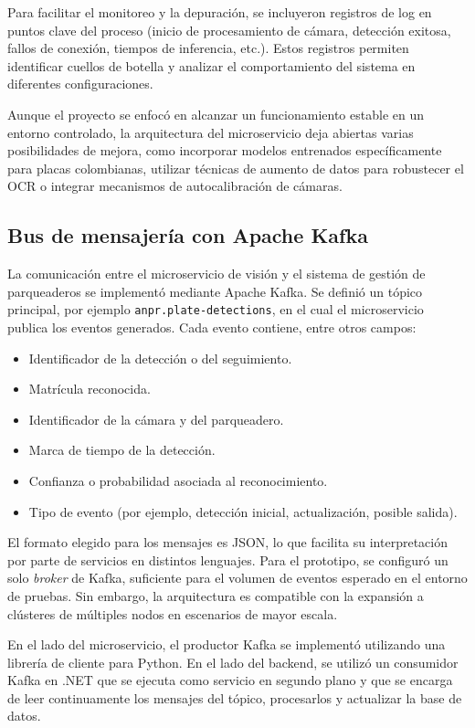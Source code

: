 Para facilitar el monitoreo y la depuración, se incluyeron registros de log en puntos clave del proceso (inicio de procesamiento de cámara, detección exitosa, fallos de conexión, tiempos de inferencia, etc.). Estos registros permiten identificar cuellos de botella y analizar el comportamiento del sistema en diferentes configuraciones.

Aunque el proyecto se enfocó en alcanzar un funcionamiento estable en un entorno controlado, la arquitectura del microservicio deja abiertas varias posibilidades de mejora, como incorporar modelos entrenados específicamente para placas colombianas, utilizar técnicas de aumento de datos para robustecer el OCR o integrar mecanismos de auto\-calibración de cámaras.

\subsection{Bus de mensajería con Apache Kafka}

La comunicación entre el microservicio de visión y el sistema de gestión de parqueaderos se implementó mediante Apache Kafka. Se definió un tópico principal, por ejemplo \texttt{anpr.plate-detections}, en el cual el microservicio publica los eventos generados. Cada evento contiene, entre otros campos:

\begin{itemize}
    \item Identificador de la detección o del seguimiento.
    \item Matrícula reconocida.
    \item Identificador de la cámara y del parqueadero.
    \item Marca de tiempo de la detección.
    \item Confianza o probabilidad asociada al reconocimiento.
    \item Tipo de evento (por ejemplo, detección inicial, actualización, posible salida).
\end{itemize}

El formato elegido para los mensajes es JSON, lo que facilita su interpretación por parte de servicios en distintos lenguajes. Para el prototipo, se configuró un solo \textit{broker} de Kafka, suficiente para el volumen de eventos esperado en el entorno de pruebas. Sin embargo, la arquitectura es compatible con la expansión a clústeres de múltiples nodos en escenarios de mayor escala.

En el lado del microservicio, el productor Kafka se implementó utilizando una librería de cliente para Python. En el lado del backend, se utilizó un consumidor Kafka en .NET que se ejecuta como servicio en segundo plano y que se encarga de leer continuamente los mensajes del tópico, procesarlos y actualizar la base de datos.

